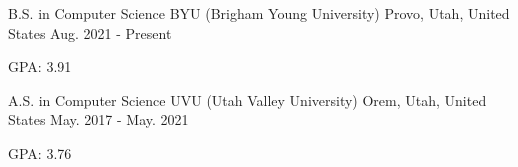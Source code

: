 

\begin{cventries}

  \cventry
    {B.S. in Computer Science} %
    {BYU (Brigham Young University)} %
    {Provo, Utah, United States} %
    {Aug. 2021 - Present} %
    {
      \begin{cvitems} %
        \item {GPA: 3.91}
      \end{cvitems}
    }
  
  \cventry
    {A.S. in Computer Science} %
    {UVU (Utah Valley University)} %
    {Orem, Utah, United States} %
    {May. 2017 - May. 2021} %
    {
      \begin{cvitems} %
        \item {GPA: 3.76}
      \end{cvitems}
    }

\end{cventries}
